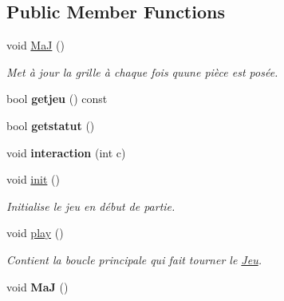 \subsection*{Public Member Functions}
\begin{DoxyCompactItemize}
\item 
\mbox{\label{classJeu_a16a1b627ca2c860ab3e6ed90111619d0}} 
void \hyperlink{classJeu_a16a1b627ca2c860ab3e6ed90111619d0}{MaJ} ()
\begin{DoxyCompactList}\small\item\em Met à jour la grille à chaque fois qu\textquotesingle{}une pièce est posée. \end{DoxyCompactList}\item 
\mbox{\label{classJeu_a511f7634136222441ecb3b64a408b505}} 
bool {\bfseries getjeu} () const
\item 
\mbox{\label{classJeu_a590b59debf5cf7906dba4bce371b2c16}} 
bool {\bfseries getstatut} ()
\item 
\mbox{\label{classJeu_a0ad85d37e6ffc90d919440a13404fae3}} 
void {\bfseries interaction} (int c)
\item 
\mbox{\label{classJeu_af8832b6cdb31f97f5dec8ed4e38a5200}} 
void \hyperlink{classJeu_af8832b6cdb31f97f5dec8ed4e38a5200}{init} ()
\begin{DoxyCompactList}\small\item\em Initialise le jeu en début de partie. \end{DoxyCompactList}\item 
\mbox{\label{classJeu_ad339f827f08dabcb27a90844822b268e}} 
void \hyperlink{classJeu_ad339f827f08dabcb27a90844822b268e}{play} ()
\begin{DoxyCompactList}\small\item\em Contient la boucle principale qui fait tourner le \hyperlink{classJeu}{Jeu}. \end{DoxyCompactList}\item 
\mbox{\label{classJeu_a16a1b627ca2c860ab3e6ed90111619d0}} 
void {\bfseries MaJ} ()
\item 
\mbox{\label{classJeu_af8832b6cdb31f97f5dec8ed4e38a5200}} 

\end{DoxyCompactItemize}
